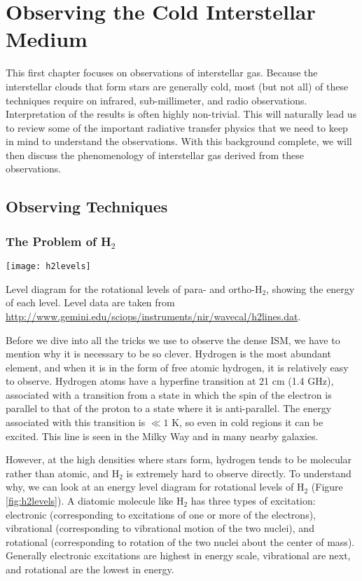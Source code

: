 \chapter{Observing the Cold Interstellar Medium}
\label{ch:obscold}

This first chapter focuses on observations of interstellar gas. Because the interstellar clouds that form stars are generally cold, most (but not all) of these techniques require on infrared, sub-millimeter, and radio observations. Interpretation of the results is often highly non-trivial. This will naturally lead us to review some of the important radiative transfer physics that we need to keep in mind to understand the observations. With this background complete, we will then discuss the phenomenology of interstellar gas derived from these observations.

\section{Observing Techniques}

\subsection{The Problem of H$_2$}

\begin{marginfigure}
\texttt{[image: h2levels]}
\caption[H$_2$ level diagram]{
\label{fig:h2levels}
Level diagram for the rotational levels of para- and ortho-H$_2$, showing the energy of each level. Level data are taken from \url{http://www.gemini.edu/sciops/instruments/nir/wavecal/h2lines.dat}.
}
\end{marginfigure}

Before we dive into all the tricks we use to observe the dense ISM, we have to mention why it is necessary to be so clever. Hydrogen is the most abundant element, and when it is in the form of free atomic hydrogen, it is relatively easy to observe.
Hydrogen atoms have a hyperfine transition at 21 cm (1.4 GHz), associated with a transition from a state in which the spin of the electron is parallel to that of the proton to a state where it is anti-parallel. The energy associated with this transition is $\ll 1$ K, so even in cold regions it can be excited. This line is seen in the Milky Way and in many nearby galaxies.
  
However, at the high densities where stars form, hydrogen tends to be molecular rather than atomic, and H$_2$ is extremely hard to observe directly. To understand why, we can look at an energy level diagram for rotational levels of H$_2$ (Figure \ref{fig:h2levels}). A diatomic molecule like H$_2$ has three types of excitation: electronic (corresponding to excitations of one or more of the electrons), vibrational (corresponding to vibrational motion of the two nuclei), and rotational (corresponding to rotation of the two nuclei about the center of mass). Generally electronic excitations are highest in energy scale, vibrational are next, and rotational are the lowest in energy.

